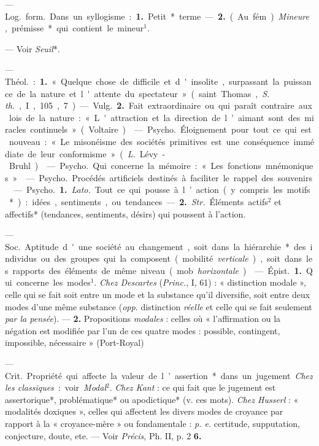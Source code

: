 \begin{itemize}[leftmargin=1cm, label=, itemsep=1pt]
 — \si{Log.} \si{form.} Dans un syllogisme : {\bf 1.} Petit*
terme. — {\bf 2.} (Au fém.). {\it Mineure}, prémisse* qui contient le
mineur$^1$.

 — Voir {\it Seuil}*.

 — \si{Théol.} : {\bf 1.} « Quelque chose de difficile et
d'insolite, surpassant la puissance de la nature et l'attente du
spectateur » (saint Thomas, {\it S. th.}, I, 105, 7). — \si{Vulg.} {\bf 2.}
Fait extraordinaire ou qui paraît contraire aux lois de la nature :
« L'attraction et la direction de l’aimant sont des miracles
continuels » (Voltaire).

 — \si{Psycho.} Éloignement pour tout ce qui est nouveau :
« Le misonéisme des sociétés primitives est une conséquence immédiate de leur
conformisme » ({\it L.} Lévy-Bruhl).

 — \si{Psycho.} Qui concerne la mémoire : « Les fonctions
mnémoniques. »

 — \si{Psycho.} Procédés artificiels destinés à faciliter le
rappel des souvenirs.

 — \si{Psycho.} {\bf 1.} {\it Lato.} Tout ce qui pousse à
l’action (y compris les motifs*) : idées, sentiments, ou tendances. —
{\bf 2.} {\it Str.} Éléments actifs$^2$ et affectifs* (tendances, sentiments,
désirs) qui poussent à l’action.

 — \si{Soc.} Aptitude d'une société au changement, soit
dans la hiérarchie* des individus ou des groupes qui la composent (mobilité
{\it verticale}), soit dans les rapports des éléments de même niveau (mob.
{\it horizontale}).

 — \si{Épist.} {\bf 1.} Qui concerne les modes$^1$. {\it Chez
Descartes} ({\it Princ.}, I, 61) : « distinction modale », celle qui se fait
soit entre un mode et la substance
qu'il diversifie, soit entre deux modes d’une même substance ({\it opp.}
distinction {\it réelle} et celle qui se fait seulement {\it par la pensée}).
—  {\bf 2.} Propositions {\it modales} : celles où « l'affirmation ou la
négation est modifiée par l'un de ces quatre modes : possible, contingent,
impossible, nécessaire » (Port-Royal)

 — \si{Crit.} Propriété qui affecte la valeur de l’assertion*
dans un jugement. {\it Chez les classiques} : voir {\it Modal}$^2$. {\it Chez
Kant} : ce qui fait que le jugement est assertorique*, problématique* ou
apodictique* (v. ces mots). {\it Chez Husserl} : « modalités doxiques »,
celles qui affectent les divers modes de croyance par rapport à la
« croyance-mère » ou fondamentale : {\it p. e.} certitude, supputation,
conjecture, doute, ete. — Voir {\it Précis}, Ph. II, p. 2 {\bf 6.}


\end{itemize}
